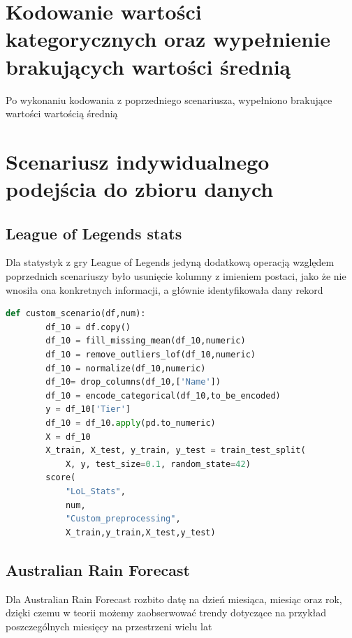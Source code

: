 \documentclass{book}
\begin{document}
\section{Kodowanie wartości kategorycznych oraz wypełnienie 
brakujących wartości średnią}
Po wykonaniu kodowania z poprzedniego scenariusza, 
wypełniono brakujące wartości wartością średnią
\section{Scenariusz indywidualnego podejścia do zbioru danych}
\subsection{League of Legends stats}
Dla statystyk z gry League of Legends jedyną dodatkową operacją względem poprzednich scenariuszy było usunięcie kolumny z 
imieniem postaci, jako że nie wnosiła ona konkretnych informacji, 
a głównie identyfikowała dany rekord

\begin{lstlisting}[language=Python, caption={Indywidualny 
    scenariusz dla zestawu danych LoL Stats}, captionpos=b]
    def custom_scenario(df,num):
        df_10 = df.copy()
        df_10 = fill_missing_mean(df_10,numeric)
        df_10 = remove_outliers_lof(df_10,numeric)
        df_10 = normalize(df_10,numeric)
        df_10= drop_columns(df_10,['Name'])
        df_10 = encode_categorical(df_10,to_be_encoded)
        y = df_10['Tier']
        df_10 = df_10.apply(pd.to_numeric)
        X = df_10
        X_train, X_test, y_train, y_test = train_test_split(
            X, y, test_size=0.1, random_state=42)
        score(
            "LoL_Stats",
            num,
            "Custom_preprocessing",
            X_train,y_train,X_test,y_test)
\end{lstlisting}

\subsection{Australian Rain Forecast}
Dla Australian Rain Forecast rozbito datę na dzień miesiąca, 
miesiąc oraz rok, dzięki czemu w teorii możemy zaobserwować 
trendy dotyczące na przykład poszczególnych miesięcy na przestrzeni 
wielu lat
\end{document}
